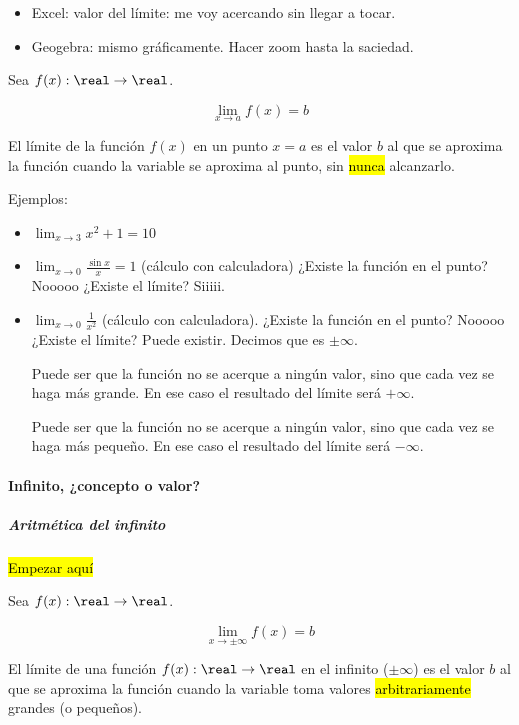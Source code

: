 \documentclass[palatino,nosec]{Docencia}
\begin{document}
\begin{itemize}
	\item Excel: valor del límite: me voy acercando sin llegar a tocar.
	\item Geogebra: mismo gráficamente. Hacer zoom hasta la saciedad.
\end{itemize}

\begin{defn}
Sea $f(x):\real\to\real$.

\[\lim_{x\to a} f(x) = b\]

El límite de la función $f(x)$ en un punto $x=a$ es el valor $b$ al que se aproxima la función cuando la variable se aproxima al punto, sin \hl{nunca} alcanzarlo.
\end{defn}

Ejemplos:
\begin{itemize}
	\item $\lim_{x\to 3} x^2 + 1 = 10$
	\item $\lim_{x\to 0} \frac{\sin x}{x} = 1$ (cálculo con calculadora) ¿Existe la función en el punto? Nooooo ¿Existe el límite? Siiiii.
	\item $\lim_{x\to 0} \frac{1}{x^2}$ (cálculo con calculadora). ¿Existe la función en el punto? Nooooo ¿Existe el límite? Puede existir. Decimos que es $\pm\infty$.

\obs Puede ser que la función no se acerque a ningún valor, sino que cada vez se haga más grande. En ese caso el resultado del límite será $+\infty$.

\obs Puede ser que la función no se acerque a ningún valor, sino que cada vez se haga más pequeño. En ese caso el resultado del límite será $-\infty$.
\end{itemize}


\paragraph{Infinito, ¿concepto o valor?}
\subparagraph{Aritmética del infinito}

\hl{Empezar aquí}

\begin{defn}
Sea $f(x):\real\to\real$.

\[\lim_{x\to \pm\infty} f(x) = b\]

El límite de una función $f(x):\real\to\real$ en el infinito ($\pm\infty$) es el valor $b$ al que se aproxima la función cuando la variable toma valores \hl{arbitrariamente} grandes (o pequeños).
\end{defn}
\end{document}
